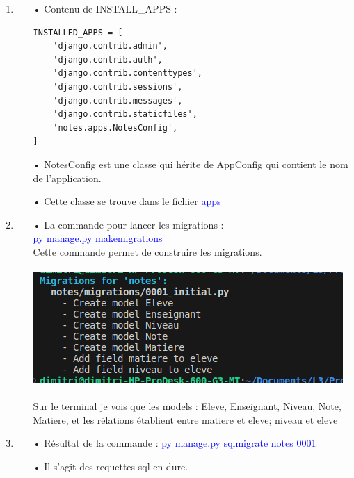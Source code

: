 \documentclass[10pt,a4paper]{article}
\begin{document}
\begin{enumerate}
\item
\begin{itemize}
\item[]
\item[•] Contenu de INSTALL\_APPS : \\
\begin{verbatim}
INSTALLED_APPS = [
    'django.contrib.admin',
    'django.contrib.auth',
    'django.contrib.contenttypes',
    'django.contrib.sessions',
    'django.contrib.messages',
    'django.contrib.staticfiles',
    'notes.apps.NotesConfig',
]
\end{verbatim}
\item[•] NotesConfig est une classe qui hérite de AppConfig qui contient le nom de l'application.
\item[•] Cette classe se trouve dans le fichier \textcolor{blue}{apps}
\end{itemize}

\item
\begin{itemize}
\item[]
\item[•] La commande pour lancer les migrations :\\ \textcolor{blue}{py manage.py makemigrations}\\
Cette commande permet de construire les migrations.\\\\
\includegraphics[scale=0.8]{2.png}\\\\
Sur le terminal je vois que les models : Eleve, Enseignant, Niveau, Note, Matiere, et les rélations établient entre matiere et eleve; niveau et eleve
\end{itemize}

\item
\begin{itemize}
\item[]
\item[•] Résultat de la commande : \textcolor{blue}{py manage.py sqlmigrate notes 0001}
\item[•] Il s'agit des requettes sql en dure.
\end{itemize}


\end{enumerate}
\end{document}
